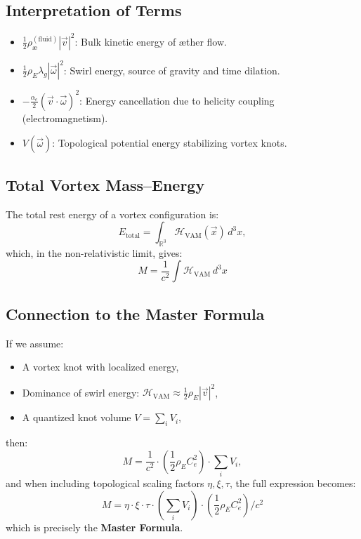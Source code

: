 \documentclass[preprint]{revtex4-2}
\begin{document}
\subsection*{Interpretation of Terms}
\begin{itemize}
    \item \( \frac{1}{2} \rho_\text{\ae}^{(\text{fluid})} |\vec{v}|^2 \): Bulk kinetic energy of æther flow.
    \item \( \frac{1}{2} \rho_{\scriptscriptstyle\boldsymbol\!E}\lambda_g |\vec{\omega}|^2 \): Swirl energy, source of gravity and time dilation.
    \item \( -\frac{\alpha_e}{2} (\vec{v} \cdot \vec{\omega})^2 \): Energy cancellation due to helicity coupling (electromagnetism).
    \item \( V(\vec{\omega}) \): Topological potential energy stabilizing vortex knots.
\end{itemize}

\subsection*{Total Vortex Mass–Energy}

The total rest energy of a vortex configuration is:
\begin{equation}
E_\text{total} = \int_{\mathbb{R}^3} \mathcal{H}_\text{VAM}(\vec{x}) \, d^3x,
\end{equation}
which, in the non-relativistic limit, gives:
\[
M = \frac{1}{c^2} \int \mathcal{H}_\text{VAM} \, d^3x
\]

\subsection*{Connection to the Master Formula}

If we assume:
\begin{itemize}
    \item A vortex knot with localized energy,
    \item Dominance of swirl energy: \( \mathcal{H}_\text{VAM} \approx \frac{1}{2} \rho_{\scriptscriptstyle\boldsymbol\!E}|\vec{v}|^2 \),
    \item A quantized knot volume \( V = \sum_i V_i \),
\end{itemize}
then:
\[
M = \frac{1}{c^2} \cdot \left( \frac{1}{2} \rho_{\scriptscriptstyle\boldsymbol\!E}C_e^2 \right) \cdot \sum_i V_i,
\]
and when including topological scaling factors \( \eta, \xi, \tau \), the full expression becomes:
\[
M = \eta \cdot \xi \cdot \tau \cdot \left( \sum_i V_i \right) \cdot \left( \frac{1}{2} \rho_{\scriptscriptstyle\boldsymbol\!E}C_e^2 \right) / c^2
\]
which is precisely the \textbf{Master Formula}.
\end{document}
